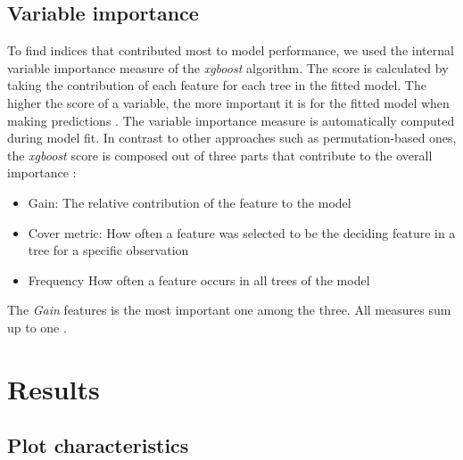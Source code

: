 \documentclass[review]{elsarticle}
\begin{document}
\subsection{Variable importance}

\noindent To find indices that contributed most to model performance, we used the internal variable importance measure of the \textit{xgboost} algorithm.
The score is calculated by taking the contribution of each feature for each tree in the fitted model.
The higher the score of a variable, the more important it is for the fitted model when making predictions \citep{chenXGBoostScalableTree2016}.
The variable importance measure is automatically computed during model fit.
In contrast to other approaches such as permutation-based ones, the \textit{xgboost} score is composed out of three parts that contribute to the overall importance \citep{chenXGBoostScalableTree2016}:

\begin{itemize}
	\item Gain: The relative contribution of the feature to the model
	\item Cover metric: How often a feature was selected to be the deciding feature in a tree for a specific observation
	\item Frequency How often a feature occurs in all trees of the model
\end{itemize}

\noindent The \textit{Gain} features is the most important one among the three.
All measures sum up to one \citep{chenXGBoostScalableTree2016}.


\section{Results}

\subsection{Plot characteristics}
\end{document}
